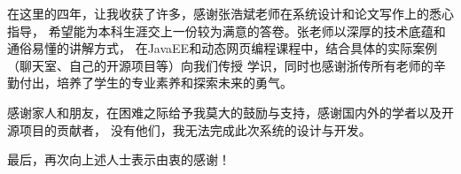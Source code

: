 \begin{acknowledgement}
	在这里的四年，让我收获了许多，感谢张浩斌老师在系统设计和论文写作上的悉心指导，
	希望能为本科生涯交上一份较为满意的答卷。张老师以深厚的技术底蕴和通俗易懂的讲解方式，
	在JavaEE和动态网页编程课程中，结合具体的实际案例（聊天室、自己的开源项目等）向我们传授
	学识，同时也感谢浙传所有老师的辛勤付出，培养了学生的专业素养和探索未来的勇气。
	

	感谢家人和朋友，在困难之际给予我莫大的鼓励与支持，感谢国内外的学者以及开源项目的贡献者，
	没有他们，我无法完成此次系统的设计与开发。

	最后，再次向上述人士表示由衷的感谢！
\end{acknowledgement}
	
